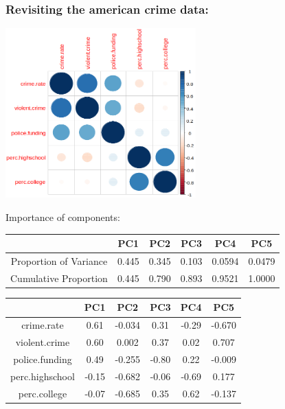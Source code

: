 \documentclass{article}
\begin{document}
\subsubsection{Revisiting the american crime data:} \label{crimecorrmatrix}
\begin{center}
\includegraphics[width = 0.55\textwidth]{PCA/cov_multivariante.png}
\end{center}
Importance of components:
\begin{table}[h]
    \centering
    \begin{tabular}{c|c|c|c|c|c}
         & PC1 &  PC2  & PC3  &  PC4   & PC5 \\
         \hline
         Proportion of Variance & 0.445 & 0.345 & 0.103 & 0.0594 & 0.0479\\ 
         \hline
         Cumulative Proportion & 0.445 & 0.790 & 0.893 & 0.9521 & 1.0000 \\
    \end{tabular}
    \newline
    \vspace{1cm}
    \newline
    \begin{tabular}{c|c|c|c|c|c}
         & PC1 &  PC2  & PC3  &  PC4   & PC5 \\
         \hline
         crime.rate       &	 0.61 &	-0.034  &	 0.31 &	-0.29 &	-0.670 \\
         \hline
         violent.crime    &	 0.60 &	 0.002  &	 0.37& 	 0.02 &	 0.707 \\
         \hline
         police.funding   &	 0.49 &	-0.255 	&	-0.80& 	 0.22 &	-0.009 \\
         \hline
         perc.highschool &	-0.15 &	-0.682 	&	-0.06& 	-0.69 &	 0.177 \\
         \hline
         perc.college    &	-0.07 &	-0.685  &	 0.35& 	 0.62 &	-0.137
    \end{tabular}
\end{table}
\end{document}
